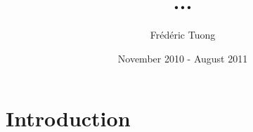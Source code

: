 \documentclass[a4paper, 11pt]{article}
\author{Frédéric Tuong}
\title{...}
\date{November 2010 - August 2011}
\begin{document}
\maketitle

\section{Introduction}

\end{document}
